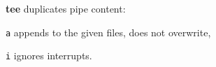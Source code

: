 \begin{compactenum}
	\item [\cmdcore] \textbf{tee} duplicates pipe content: %
	\item [\texttt{a}] appends to the given files, does not overwrite,
	\item [\texttt{i}] ignores interrupts.
\end{compactenum}

